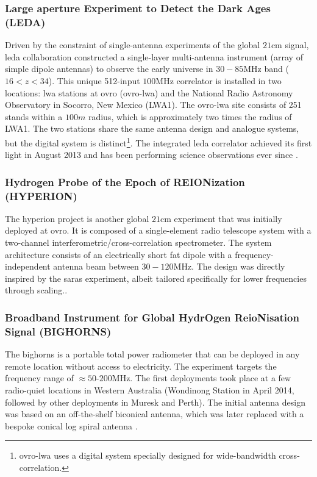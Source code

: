 \documentclass[12pt, TexShade, letterpaper]{report}
\begin{document}
\subsubsection{Large aperture Experiment to Detect the Dark Ages (LEDA)}
Driven by the constraint of single-antenna experiments of the global $\mathrm{21cm}$ signal, \gls{leda} collaboration constructed a single-layer multi-antenna instrument (array of simple dipole antennas) to observe the early universe in $30-85\mathrm{MHz}$ band ($16 < z < 34$).
This unique 512-input $100\mathrm{MHz}$ correlator is installed in two locations: \gls{lwa} stations at \gls{ovro} (\gls{ovro}-\gls{lwa}) and the National Radio Astronomy Observatory in Socorro, New Mexico (LWA1). 
The \gls{ovro}-\gls{lwa} site consists of 251 stands within a $100m$ radius, which is approximately two times the radius of LWA1. The two stations share the same antenna design and analogue systems, but the digital system is distinct\footnote{\gls{ovro}-\gls{lwa} uses a digital system specially designed for wide-bandwidth cross-correlation.}. The integrated \gls{leda} correlator achieved its first light in August 2013 and has been performing science observations ever since \cite{leda_beam, leda_foreground, leda_1, leda_2, leda_design}.\par

\subsubsection{Hydrogen Probe of the Epoch of REIONization (HYPERION)}
The \gls{hyperion} project is another global $\mathrm{21cm}$ experiment that was initially deployed at \gls{ovro}. It is composed of a single-element radio telescope system with a two-channel interferometric/cross-correlation spectrometer. The system architecture consists of an electrically short fat dipole with a frequency-independent antenna beam between $30-120 \mathrm{MHz}$. The design was directly inspired by the \gls{saras} experiment, albeit tailored specifically for lower frequencies through scaling.\cite{hyperion_1, hyperion_2, hyperion_3}.\par

\subsubsection{Broadband Instrument for Global HydrOgen ReioNisation Signal (BIGHORNS)}
The \gls{bighorns} is a portable total power radiometer that can be deployed in any remote location without access to electricity. The experiment targets the frequency range of $\approx 50 \text{-} 200 \mathrm{MHz}$. The first deployments took place at a few radio-quiet locations in Western Australia (Wondinong Station in April 2014, followed by other deployments in  Muresk and Perth). The initial antenna design was based on an off-the-shelf biconical antenna, which was later replaced with a bespoke conical log spiral antenna \cite{bighorns_1}.
\end{document}
